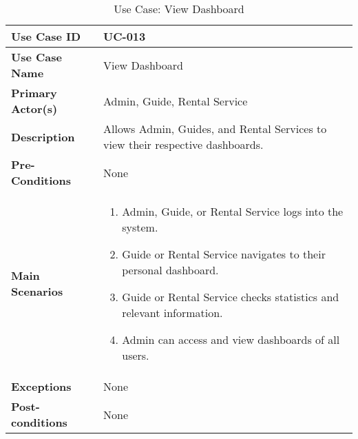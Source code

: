 \begin{table}[ht]
    \centering
    \begin{tabular}{|l|p{}|}
        \hline
        \textbf{Use Case ID} & UC-013 \\
        \hline
        \textbf{Use Case Name} & View Dashboard \\
        \hline
        \textbf{Primary Actor(s)} & Admin, Guide, Rental Service \\
        \hline
        \textbf{Description} & Allows Admin, Guides, and Rental Services to view their respective dashboards. \\
        \hline
        \textbf{Pre-Conditions} & None \\
        \hline
        \textbf{Main Scenarios} & 
        \begin{enumerate}[label=\arabic*.,itemsep=0pt]
            \item Admin, Guide, or Rental Service logs into the system.
            \item Guide or Rental Service navigates to their personal dashboard.
            \item Guide or Rental Service checks statistics and relevant information.
            \item Admin can access and view dashboards of all users.
        \end{enumerate} \\
        \hline
        \textbf{Exceptions} & None \\
        \hline
        \textbf{Post-conditions} & None \\
        \hline
    \end{tabular}
    \label{tab:use-case-view-dashboard}
    \caption{Use Case: View Dashboard}
\end{table}


